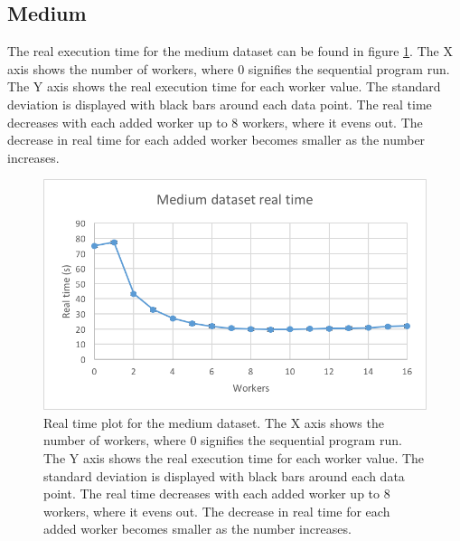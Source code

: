 \subsection{Medium}
The real execution time for the medium dataset can be found in figure \ref{fig:dataset_3_real_time}.
The X axis shows the number of workers, where 0 signifies the sequential program run.
The Y axis shows the real execution time for each worker value. The standard deviation is displayed with black bars around each data point. The real time
decreases with each added worker up to 8 workers, where it evens out. The decrease in real time for each added worker becomes smaller as the number increases.
\begin{figure}[ht]
  \centering
  \includegraphics[width=120mm]{figures/dataset_3/dataset_3_real_time.png}
  \caption[Real time plot for the medium dataset.]{Real time plot for the medium dataset. The X axis shows the number of workers, where 0 signifies the sequential program run.
  The Y axis shows the real execution time for each worker value. The standard deviation is displayed with black bars around each data point. The real time
  decreases with each added worker up to 8 workers, where it evens out. The decrease in real time for each added worker becomes smaller as the number increases.}
  \label{fig:dataset_3_real_time}
\end{figure}

